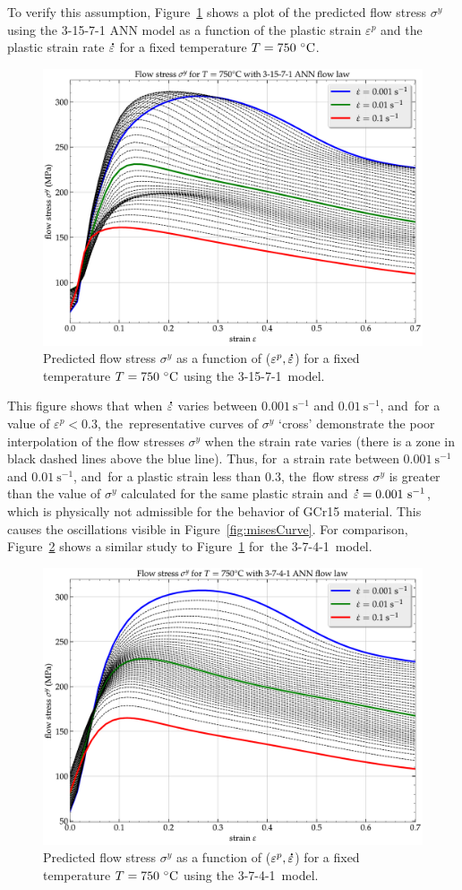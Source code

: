 \documentclass[algorithms,article,accept,pdftex,moreauthors]{Definitions/mdpi}
\DeclareRobustCommand{\mdot}[1]{\accentset{\mbox{\bfseries .}}{#1}}
\DeclareRobustCommand{\ps}{\text{s}^{-1}}
\begin{document}
To verify this assumption, Figure~\ref{fig:ShapeOF1} shows a plot of the predicted flow stress $\sigma^y$ using the 3-15-7-1 ANN model as a function of the plastic strain $\varepsilon^p$ and the plastic strain rate $\mdot\varepsilon$ for a fixed temperature $T=750~\celsius$.
\begin{figure}[H]
\includegraphics[width=0.72\columnwidth]{Figures/Shape-3-15-7-1}
\caption{Predicted flow stress $\sigma^y$ as a function of ($\varepsilon^p, \mdot\varepsilon$) for a fixed temperature $T=750~\celsius$ using the 3-15-7-1~model.}
\label{fig:ShapeOF1}
\end{figure}
This figure shows that when $\mdot\varepsilon$ varies between $0.001~\ps$ and $0.01~\ps$, and~for a value of $\varepsilon^p<0.3$, the~representative curves of $\sigma^y$ ‘cross’ demonstrate the poor interpolation of the flow stresses $\sigma^y$ when the strain rate varies (there is a zone in black dashed lines above the blue line).
Thus, for~a strain rate between $0.001~\ps$ and $0.01~\ps$, and~for a plastic strain less than $0.3$, the~flow stress $\sigma^y$ is greater than the value of $\sigma^y$ calculated for the same plastic strain and $\mdot\varepsilon=0.001~\ps$, which is physically not admissible for the behavior of GCr15 material.
This causes the oscillations visible in Figure~\ref{fig:misesCurve}.
For comparison, Figure~\ref{fig:ShapeOF2} shows a similar study to Figure~\ref{fig:ShapeOF1} for~the 3-7-4-1~model.
\begin{figure}[H]
\includegraphics[width=0.75\columnwidth]{Figures/Shape-3-7-4-1}
\caption{Predicted flow stress $\sigma^y$ as a function of ($\varepsilon^p, \mdot\varepsilon$) for a fixed temperature $T=750~\celsius$ using the 3-7-4-1~model.}
\label{fig:ShapeOF2}
\end{figure}
\end{document}
